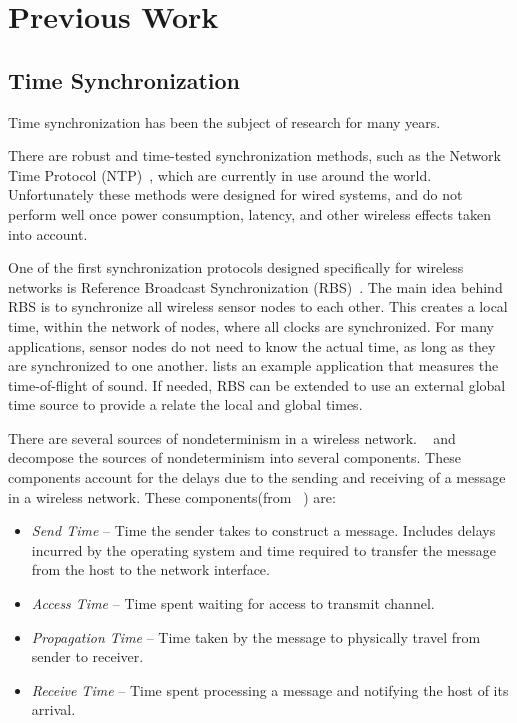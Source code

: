 \section{Previous Work}\label{section:litsurvey}
\subsection{Time Synchronization}
Time synchronization has been the subject of research for many years.

There are robust and time-tested synchronization methods, such as the Network Time Protocol (NTP)~\cite{synchronization:NTP}, which are currently in use around the world. Unfortunately these methods were designed for wired systems, and do not perform well once power consumption, latency, and other wireless effects taken into account. 

One of the first synchronization protocols designed specifically for wireless networks is Reference Broadcast Synchronization (RBS)~\cite{synchronization:RBS}. The main idea behind RBS is to synchronize all wireless sensor nodes to each other. This creates a local time, within the network of nodes, where all clocks are synchronized. For many applications, sensor nodes do not need to know the actual time, as long as they are synchronized to one another. \cite{synchronization:RBS} lists an example application that measures the time-of-flight of sound. If needed, RBS can be extended to use an external global time source to provide a relate the local and global times.

There are several sources of nondeterminism in a wireless network. ~\cite{synchronization:RBS} and ~\cite{synchronization:FTSP} decompose the sources of nondeterminism into several components. These components account for the delays due to the sending and receiving of a message in a wireless network. These components(from ~\cite{synchronization:RBS}) are: 
\begin{itemize}
\item \emph{Send Time} -- Time the sender takes to construct a message. Includes delays incurred by the operating system and time required to transfer the message from the host to the network interface.
\item \emph{Access Time} -- Time spent waiting for access to transmit channel.
\item \emph{Propagation Time} -- Time taken by the message to physically travel from sender to receiver.
\item \emph{Receive Time} -- Time spent processing a message and notifying the host of its arrival.
\end{itemize}


